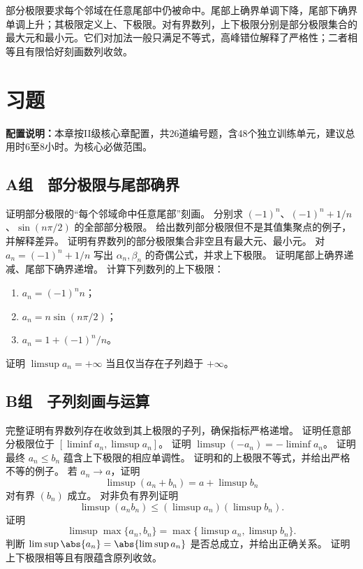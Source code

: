 部分极限要求每个邻域在任意尾部中仍被命中。尾部上确界单调下降，尾部下确界单调上升；其极限定义上、下极限。对有界数列，上下极限分别是部分极限集合的最大元和最小元。它们对加法一般只满足不等式，高峰错位解释了严格性；二者相等且有限恰好刻画数列收敛。

\section*{习题}

\noindent\textbf{配置说明：}本章按II级核心章配置，共26道编号题，含48个独立训练单元，建议总用时6至8小时。为核心必做范围。

\subsection*{A组　部分极限与尾部确界}
\begin{enumerate}[label=\textbf{12.\arabic*.}]
  \mustdo 证明部分极限的“每个邻域命中任意尾部”刻画。
  \mustdo 分别求 \((-1)^n\)、\((-1)^n+1/n\)、\(\sin(n\pi/2)\) 的全部部分极限。
  \mustdo 给出数列部分极限但不是其值集聚点的例子，并解释差异。
  \mustdo 证明有界数列的部分极限集合非空且有最大元、最小元。
  \mustdo 对 \(a_n=(-1)^n+1/n\) 写出 \(\alpha_n,\beta_n\) 的奇偶公式，并求上下极限。
  \mustdo 证明尾部上确界递减、尾部下确界递增。
  \mustdo 计算下列数列的上下极限：
 \begin{enumerate}[label=(\arabic*)]
  \item \(a_n=(-1)^n n\)；
  \item \(a_n=n\sin(n\pi/2)\)；
  \item \(a_n=1+(-1)^n/n\)。
 \end{enumerate}
  \mustdo 证明 \(\limsup a_n=+\infty\) 当且仅当存在子列趋于 \(+\infty\)。
\end{enumerate}

\subsection*{B组　子列刻画与运算}
\begin{enumerate}[label=\textbf{12.\arabic*.},resume]
  \mustdo 完整证明有界数列存在收敛到其上极限的子列，确保指标严格递增。
  \mustdo 证明任意部分极限位于 \([\liminf a_n,\limsup a_n]\)。
  \mustdo 证明 \(\limsup(-a_n)=-\liminf a_n\)。
  \mustdo 证明最终 \(a_n\le b_n\) 蕴含上下极限的相应单调性。
  \mustdo 证明和的上极限不等式，并给出严格不等的例子。
  \mustdo 若 \(a_n\to a\)，证明
 \[
 \limsup(a_n+b_n)=a+\limsup b_n
 \]
 对有界 \((b_n)\) 成立。
  \mustdo 对非负有界列证明
 \[
 \limsup(a_nb_n)\le(\limsup a_n)(\limsup b_n).
 \]
  \mustdo 证明
 \[
 \limsup\max\{a_n,b_n\}
 =\max\{\limsup a_n,\limsup b_n\}.
 \]
  \mustdo 判断 \(\limsup\abs{a_n}=\abs{\limsup a_n}\) 是否总成立，并给出正确关系。
  \mustdo 证明上下极限相等且有限蕴含原列收敛。
\end{enumerate}

